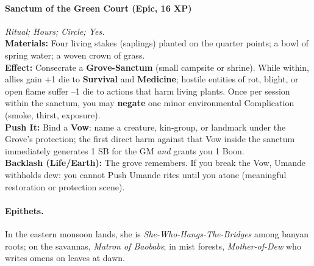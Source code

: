\paragraph{Sanctum of the Green Court (Epic, 16 XP)} \emph{Ritual; Hours; Circle; Yes.}\\
\textbf{Materials:} Four living stakes (saplings) planted on the quarter points; a bowl of spring water; a woven crown of grass.\\
\textbf{Effect:} Consecrate a \textbf{Grove-Sanctum} (small campsite or shrine). While within, allies gain +1 die to \textbf{Survival} and \textbf{Medicine}; hostile entities of rot, blight, or open flame suffer --1 die to actions that harm living plants. Once per session within the sanctum, you may \textbf{negate} one minor environmental Complication (smoke, thirst, exposure).\\
\textbf{Push It:} Bind a \textbf{Vow}: name a creature, kin-group, or landmark under the Grove’s protection; the first direct harm against that Vow inside the sanctum immediately generates 1 SB for the GM \emph{and} grants you 1 Boon.\\
\textbf{Backlash (Life/Earth):} The grove remembers. If you break the Vow, Umande withholds dew: you cannot Push Umande rites until you atone (meaningful restoration or protection scene).

\paragraph{Epithets.} In the eastern monsoon lands, she is \textit{She-Who-Hangs-The-Bridges} among banyan roots; on the savannas, \textit{Matron of Baobabs}; in mist forests, \textit{Mother-of-Dew} who writes omens on leaves at dawn.
